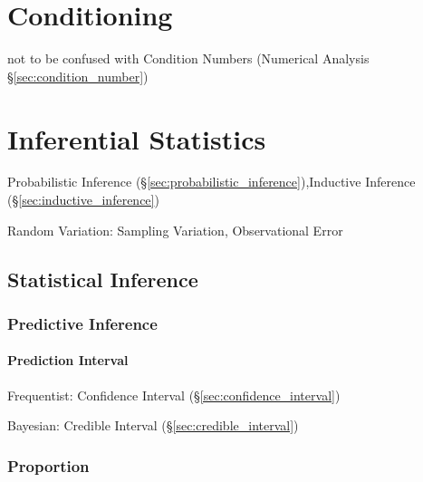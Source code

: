 \section{Conditioning}\label{sec:conditioning}

\fist not to be confused with Condition Numbers (Numerical Analysis
\S\ref{sec:condition_number})



\section{Inferential Statistics}\label{sec:inferential_statistics}

Probabilistic Inference
(\S\ref{sec:probabilistic_inference}),Inductive Inference
(\S\ref{sec:inductive_inference})

Random Variation: Sampling Variation, Observational Error



\subsection{Statistical Inference}\label{sec:statistical_inference}

\subsubsection{Predictive Inference}\label{sec:predictive_inference}

\paragraph{Prediction Interval}\label{sec:prediction_interval}\hfill

Frequentist: Confidence Interval (\S\ref{sec:confidence_interval})

Bayesian: Credible Interval (\S\ref{sec:credible_interval})



\subsubsection{Proportion}\label{sec:statistical_proportion}

